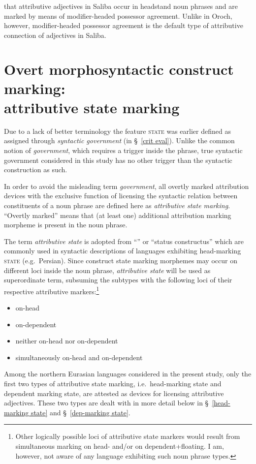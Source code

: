  that attributive adjectives in Saliba occur in headstand noun phrases and are marked by means of modifier\hyp{}headed possessor agreement. Unlike in Oroch, however, modifier\hyp{}headed possessor agreement is the default type of attributive connection of adjectives in Saliba.

\section[Attributive state marking]{Overt morphosyntactic construct marking:\\attributive state marking}

Due to a lack of better terminology the feature \textsc{state} was earlier defined as assigned through \emph{syntactic government} (in \S~\ref{crit eval}). Unlike the common notion of \emph{government}, which requires a trigger inside the phrase, true syntactic government considered in this study has no other trigger than the syntactic construction as such.

In order to avoid the misleading term \emph{government}, all overtly marked attribution devices with the exclusive function of licensing the syntactic relation between constituents of a noun phrase are defined here as \emph{attributive state marking}. “Overtly marked” means that (at least one) additional attribution marking morpheme is present in the noun phrase.

The term \emph{attributive state} is adopted from “” or “status constructus” which are commonly used in syntactic descriptions of languages exhibiting head-marking \textsc{state} (e.g.~Persian). Since construct state marking morphemes may occur on different loci inside the noun phrase, \emph{attributive state} will be used as superordinate term, subsuming the subtypes with the following loci of their respective attributive markers:\footnote{Other logically possible loci of attributive state markers would result from simultaneous marking on head- and\slash{}or on dependent+floating. I am, however, not aware of any language exhibiting such noun phrase types.}
\begin{itemize}
\settowidth{}
\item on-head 
\item on-dependent 
\item neither on-head nor on-dependent 
\item simultaneously on-head and on-dependent 
\end{itemize}
Among the northern Eurasian languages considered in the present study, only the first two types of attributive state marking, i.e.~head-marking state and dependent marking state, are attested as devices for licensing attributive adjectives. These two types are dealt with in more detail below in \S~\ref{head-marking state} and \S~\ref{dep-marking state}.

